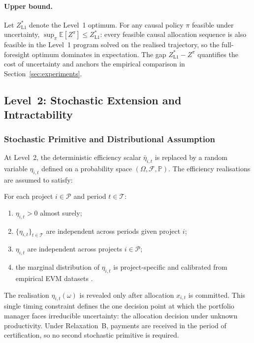 \paragraph{Upper bound.}
Let $Z^*_{\mathrm{L1}}$ denote the Level~1 optimum. For any causal
policy $\pi$ feasible under uncertainty, $\sup_\pi \mathbb{E}[Z^\pi]
\leq Z^*_{\mathrm{L1}}$: every feasible causal allocation sequence is
also feasible in the Level~1 program solved on the realised trajectory,
so the full-foresight optimum dominates in expectation. The gap
$Z^*_{\mathrm{L1}} - Z^\pi$ quantifies the cost of uncertainty and
anchors the empirical comparison in Section~\ref{sec:experiments}.

\subsection{Level~2: Stochastic Extension and Intractability}
\label{subsec:level2}

\subsubsection{Stochastic Primitive and Distributional Assumption}
\label{subsubsec:l2_primitive}

At Level~2, the deterministic efficiency scalar $\bar{\eta}_{i,t}$ is
replaced by a random variable $\eta_{i,t}$ defined on a probability
space $(\Omega, \mathcal{F}, \mathbb{P})$. The efficiency realisations
are assumed to satisfy:
\begin{assumption}
  \label{ass:eta}
  For each project $i \in \mathcal{P}$ and period $t \in \mathcal{T}$:
  \begin{enumerate}[label=(\roman*)]
    \item $\eta_{i,t} > 0$ almost surely;
    \item $\{\eta_{i,t}\}_{t \in \mathcal{T}}$ are independent across
      periods given project $i$;
    \item $\eta_{i,t}$ are independent across projects $i \in \mathcal{P}$;
    \item the marginal distribution of $\eta_{i,t}$ is project-specific
      and calibrated from empirical EVM datasets
      \citep{Acebes2015, Batselier2017}.
  \end{enumerate}
  \end{assumption}

  The realisation $\eta_{i,t}(\omega)$ is revealed only after allocation
  $x_{i,t}$ is committed. This single timing constraint defines the one
  decision point at which the portfolio manager faces irreducible
  uncertainty: the allocation decision under unknown productivity.
  Under Relaxation~B, payments are received in the period of
  certification, so no second stochastic primitive is required.

